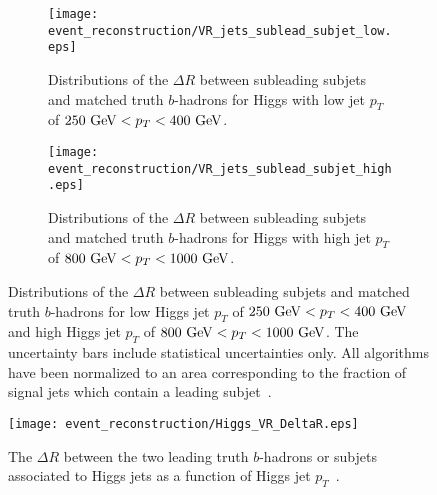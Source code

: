 \begin{figure}[htbp]
 \centering
 \begin{subfigure}[t]{0.48\textwidth}
  \centering
  \texttt{[image: event\_reconstruction/VR\_jets\_sublead\_subjet\_low.eps]}
  \caption[Distributions of the $\Delta R$ between subleading subjets and matched truth $b$-hadrons for Higgs with low jet $p_{T}$ of ${250~\GeV < p_{T} < 400~\GeV}$.]{%
   Distributions of the $\Delta R$ between subleading subjets and matched truth $b$-hadrons for Higgs with low jet $p_{T}$ of ${250~\GeV < p_{T} < 400~\GeV}$.}
  \label{fig:VR_jets_sublead_subjet_low}
 \end{subfigure}%
 \quad
 \begin{subfigure}[t]{0.48\textwidth}
  \centering
  \texttt{[image: event\_reconstruction/VR\_jets\_sublead\_subjet\_high.eps]}
  \caption[Distributions of the $\Delta R$ between subleading subjets and matched truth $b$-hadrons for Higgs with high jet $p_{T}$ of ${800~\GeV < p_{T} < 1000~\GeV}$.]{%
   Distributions of the $\Delta R$ between subleading subjets and matched truth $b$-hadrons for Higgs with high jet $p_{T}$ of ${800~\GeV < p_{T} < 1000~\GeV}$.}
  \label{fig:VR_jets_sublead_subjet_high}
 \end{subfigure}%
 \caption[Distributions of the $\Delta R$ between subleading subjets and matched truth $b$-hadrons for two different Higgs jet $p_{T}$ bins.]{%
  Distributions of the $\Delta R$ between subleading subjets and matched truth $b$-hadrons for low Higgs jet $p_{T}$ of ${250~\GeV < p_{T} < 400~\GeV}$ and high Higgs jet $p_{T}$ of ${800~\GeV < p_{T} < 1000~\GeV}$.
  The uncertainty bars include statistical uncertainties only.
  All algorithms have been normalized to an area corresponding to the fraction of signal jets which contain a leading subjet~\cite{ATL-PHYS-PUB-2017-010}.}
 \label{fig:VR_jets_sublead_subjet}
\end{figure}

\begin{figure}[htbp]
 \centering
 \texttt{[image: event\_reconstruction/Higgs\_VR\_DeltaR.eps]}
 \caption[The $\Delta R$ between the two leading truth $b$-hadrons or subjets associated to Higgs jets as a function of Higgs jet $p_{T}$.]{%
  The $\Delta R$ between the two leading truth $b$-hadrons or subjets associated to Higgs jets as a function of Higgs jet $p_{T}$~\cite{Salzburger:HammersAndNails}.}
 \label{fig:Higgs_VR_DeltaR}
\end{figure}


